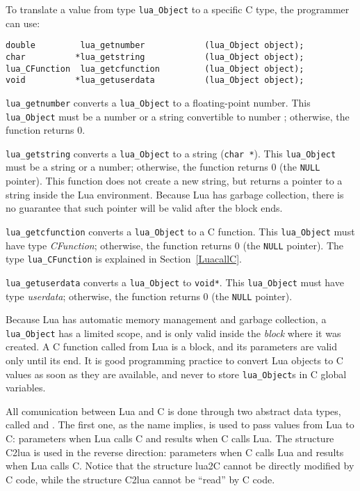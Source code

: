 To translate a value from type \verb'lua_Object' to a specific C type,
the programmer can use:
\begin{verbatim}
double         lua_getnumber            (lua_Object object);
char          *lua_getstring            (lua_Object object);
lua_CFunction  lua_getcfunction         (lua_Object object);
void          *lua_getuserdata          (lua_Object object);
\end{verbatim}
\verb'lua_getnumber' converts a \verb'lua_Object' to a floating-point number.
This \verb'lua_Object' must be a number or a string convertible to number
; otherwise, the function returns 0.

\verb'lua_getstring' converts a \verb'lua_Object' to a string (\verb'char *').
This \verb'lua_Object' must be a string or a number;
otherwise, the function returns 0 (the \verb|NULL| pointer).
This function does not create a new string, but returns a pointer to
a string inside the Lua environment.
Because Lua has garbage collection, there is no guarantee that such
pointer will be valid after the block ends.

\verb'lua_getcfunction' converts a \verb'lua_Object' to a C function.
This \verb'lua_Object' must have type {\em CFunction\/};
otherwise, the function returns 0 (the \verb|NULL| pointer).
The type \verb'lua_CFunction' is explained in Section~\ref{LuacallC}.

\verb'lua_getuserdata' converts a \verb'lua_Object' to \verb'void*'.
This \verb'lua_Object' must have type {\em userdata\/};
otherwise, the function returns 0 (the \verb|NULL| pointer).

Because Lua has automatic memory management and garbage collection,
a \verb'lua_Object' has a limited scope,
and is only valid inside the {\em block\/} where it was created.
A C function called from Lua is a block,
and its parameters are valid only until its end.
It is good programming practice to convert Lua objects to C values
as soon as they are available,
and never to store \verb'lua_Object's in C global variables.


All comunication between Lua and C is done through two
abstract data types, called  and .
The first one, as the name implies, is used to pass values
from Lua to C: parameters when Lua calls C and results when C calls Lua.
The structure C2lua is used in the reverse direction:
parameters when C calls Lua and results when Lua calls C.
Notice that the structure lua2C cannot be directly modified by C code,
while the structure C2lua cannot be ``read'' by C code.

